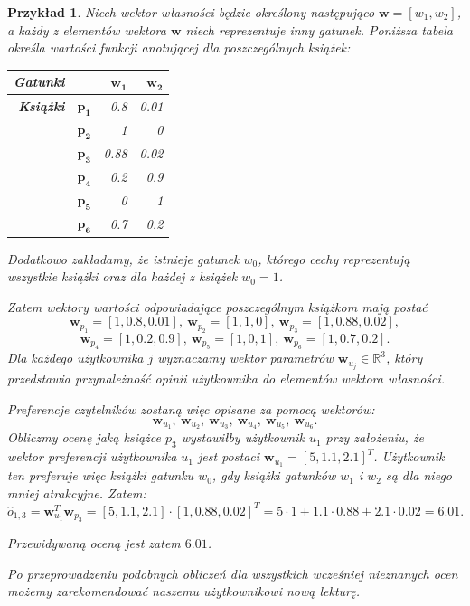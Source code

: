 \documentclass[12pt,a4paper]{report}
\newtheorem{przyklad}{Przykład}[chapter]{\normalfont}
\newcommand{\setR}{\mathbb{R}}
\begin{document}
\begin{przyklad}
Niech wektor własności będzie określony następująco $\mathbf{w} = [w_1, w_2]$, a każdy z elementów wektora $\mathbf{w}$ niech reprezentuje inny gatunek. Poniższa tabela określa wartości funkcji anotującej dla poszczególnych książek:
\begin{center}
\begin{tabular}{|r|r|r|r|} \hline
\textbf{Gatunki} & & $\mathbf{w_1}$ & $\mathbf{w_2}$  \\
\hline
\hline
\textbf{Książki} &$\mathbf{p_1}$ & 0.8 & 0.01 \\
\hline
&$\mathbf{p_2}$ & 1 & 0  \\
\hline
&$\mathbf{p_3}$ & 0.88 & 0.02 \\
\hline
&$\mathbf{p_4}$ & 0.2 & 0.9 \\
\hline
&$\mathbf{p_5}$ & 0 & 1 \\
\hline
&$\mathbf{p_6}$ & 0.7 & 0.2 \\
\hline
\end{tabular}
\end{center}
Dodatkowo zakładamy, że istnieje gatunek $w_0$, którego cechy reprezentują wszystkie książki oraz dla każdej z książek $w_0=1$.

Zatem wektory wartości odpowiadające poszczególnym książkom mają postać
$$
\mathbf{w}_{p_1} = [1, 0.8, 0.01], \: \mathbf{w}_{p_2} = [1, 1, 0], \: \mathbf{w}_{p_3} = [1, 0.88, 0.02],
$$
$$
\mathbf{w}_{p_4} = [1, 0.2, 0.9], \: \mathbf{w}_{p_5} = [1, 0, 1], \: \mathbf{w}_{p_6} = [1, 0.7, 0.2].
$$
Dla każdego użytkownika $j$ wyznaczamy wektor parametrów $\mathbf{w}_{u_j} \in \setR^3$, który przedstawia przynależność opinii użytkownika do elementów wektora własności. 

Preferencje czytelników zostaną więc opisane za pomocą wektorów:
$$
\mathbf{w}_{u_1}, \: \mathbf{w}_{u_2}, \: \mathbf{w}_{u_3}, \: \mathbf{w}_{u_4}, \: \mathbf{w}_{u_5}, \: \mathbf{w}_{u_6}.
$$
Obliczmy ocenę jaką książce $p_3$ wystawiłby użytkownik $u_1$ przy założeniu, że wektor preferencji użytkownika $u_1$ jest postaci $\mathbf{w}_{u_1}= [5,1.1,2.1]^T$. Użytkownik ten preferuje więc książki gatunku $w_0$, gdy książki gatunków $w_1$ i $w_2$ są dla niego mniej atrakcyjne.
Zatem:
$$
\widehat{o}_{1,3} = \mathbf{w}_{u_1}^T \mathbf{w}_{p_3} = [5,1.1,2.1] \cdot [1, 0.88, 0.02] ^ T = 5 \cdot 1 + 1.1 \cdot 0.88 + 2.1 \cdot 0.02 = 6.01.
$$

Przewidywaną oceną jest zatem $6.01$. 

Po przeprowadzeniu podobnych obliczeń dla wszystkich wcześniej nieznanych ocen możemy zarekomendować naszemu użytkownikowi nową lekturę.
\end{przyklad}
\end{document}
